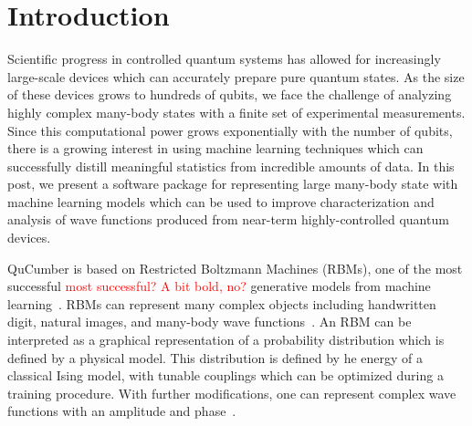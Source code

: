 \documentclass[submission, Phys]{SciPost}
\begin{document}
\section{Introduction}

Scientific progress in controlled quantum systems has allowed for increasingly large-scale devices which can accurately prepare pure quantum states.
As the size of these devices grows to hundreds of qubits, we face the challenge of analyzing highly complex many-body states with a finite set of experimental measurements.
Since this computational power grows exponentially with the number of qubits, there is a growing interest in using machine learning techniques which can successfully distill meaningful statistics from incredible amounts of data.
In this post, we present a software package for representing large many-body state with machine learning models which can be used to improve characterization and analysis of wave functions produced from near-term highly-controlled quantum devices.

QuCumber is based on Restricted Boltzmann Machines (RBMs), one of the most successful \textcolor{red}{most successful? A bit bold, no?} generative models from machine learning~\cite{Smolensky}.
RBMs can represent many complex objects including handwritten digit, natural images, and many-body wave functions~\cite{Torlai2016thermo, CarleoTroyer2017Science, ChenWang2018, GlasserCirac2018}.
An RBM can be interpreted as a graphical representation of a probability distribution which is defined by a physical model. This distribution is defined by he energy of a classical Ising model, with tunable couplings which can be optimized during a training procedure.
With further modifications, one can represent complex wave functions with an amplitude and phase~\cite{torlai2018tomography}.
\end{document}
